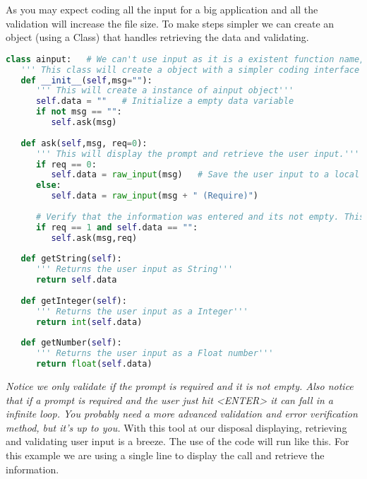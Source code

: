 As you may expect coding all the input for a big application and all the
validation will increase the file size. To make steps simpler we can create an
object (using a Class) that handles retrieving the data and validating.
\lstset{basicstyle=\scriptsize, numbers=left, captionpos=b, tabsize=4}
\begin{lstlisting}[caption=Input Validation,language={Python},
xleftmargin=15pt, label=lst:inputvalidation]
class ainput:   # We can't use input as it is a existent function name, so we use AInput for Advance Input
   ''' This class will create a object with a simpler coding interface to retrieve console input'''
   def __init__(self,msg=""):
      ''' This will create a instance of ainput object'''
      self.data = ""   # Initialize a empty data variable
      if not msg == "":
         self.ask(msg)
 
   def ask(self,msg, req=0):
      ''' This will display the prompt and retrieve the user input.'''
      if req == 0:
         self.data = raw_input(msg)   # Save the user input to a local object variable
      else:
         self.data = raw_input(msg + " (Require)")
 
      # Verify that the information was entered and its not empty. This will accept a space character. Better Validation needed
      if req == 1 and self.data == "":
         self.ask(msg,req)
 
   def getString(self):
      ''' Returns the user input as String'''
      return self.data
 
   def getInteger(self):
      ''' Returns the user input as a Integer'''
      return int(self.data)
 
   def getNumber(self):
      ''' Returns the user input as a Float number'''
      return float(self.data)
\end{lstlisting}
\textit{Notice we only validate if the prompt is required and it is not empty.
Also notice that if a prompt is required and the user just hit <ENTER> it can
fall in a infinite loop. You probably need a more advanced validation and error
verification method, but it's up to you.}
With this tool at our disposal displaying, retrieving and validating user input
is a breeze. The use of the code will run like this. For this example we are
using a single line to display the call and retrieve the information.
\lstset{basicstyle=\scriptsize, numbers=left, captionpos=b, tabsize=4}
